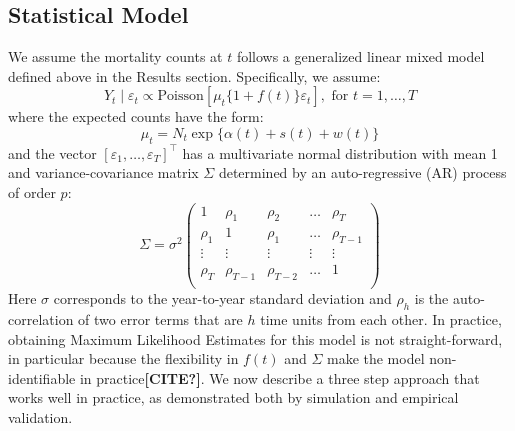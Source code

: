 \documentclass[11pt]{article}
\begin{document}
\subsection{Statistical Model}
\label{subsec:statistical-model}
We assume the mortality counts at $t$ follows a generalized linear mixed model defined above in the Results section. Specifically, we assume:
\begin{equation*}
    Y_t \mid \varepsilon_t \propto \mbox{Poisson}[ \mu_t \{1 + f(t)\}  \varepsilon_t ], \mbox{ for } t = 1, \dots,T 
\end{equation*}
where the expected counts have the form:
\begin{equation*}
    \mu_t =N_t  \exp\{ \alpha(t) + s(t) + w(t) \}
\end{equation*}
and the vector $[\varepsilon_1, \ldots, \varepsilon_T]^\top$ has a multivariate normal distribution with mean 1 and variance-covariance matrix $\Sigma$ determined by an auto-regressive (AR) process of order $p$:
\begin{equation*}
    \Sigma = \sigma^2
    \begin{pmatrix} 1 & \rho_1 & \rho_{2} & \dots & \rho_{T} \\ 
    \rho_{1} & 1 & \rho_{1} & \ldots & \rho_{T-1} \\
    \vdots & \vdots & \vdots & \vdots & \vdots \\
    \rho_{T} & \rho_{T-1} & \rho_{T-2} & \dots & 1 \\ 
    \end{pmatrix}
\end{equation*}
Here $\sigma$ corresponds to the year-to-year standard deviation and $\rho_h$ is the auto-correlation of two error terms that are $h$ time units from each other. In practice, obtaining Maximum Likelihood Estimates for this model is not straight-forward, in particular because the flexibility in $f(t)$ and $\Sigma$ make the model non-identifiable in practice\textbf{[CITE?]}. We now describe a three step approach that works well in practice, as demonstrated both by simulation and empirical validation.
\end{document}
